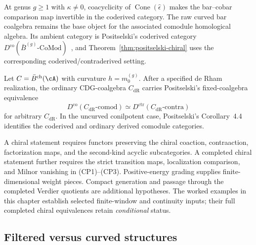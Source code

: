 \begin{remark}
\label{rem:positselski-acyclicity}
At genus $g \geq 1$ with $\kappa \neq 0$, coacyclicity of
$\operatorname{Cone}(\widehat\epsilon)$ makes the bar--cobar
comparison map invertible in the coderived category.  The raw curved
bar coalgebra remains the base object for the associated comodule
homological algebra.  Its ambient category is Positselski's coderived
category
$D^{\mathrm{co}}(\bar{B}^{(g)}\text{-}\mathrm{CoMod})$~\cite[\S\S3--4]{Positselski11},
and Theorem~\ref{thm:positselski-chiral} uses the corresponding
coderived/contraderived setting.
\end{remark}

\begin{remark}
\label{rem:derived-coderived-chiral-CDG}
Let \(C=\bar B^{\mathrm{ch}}(\cA)\) with curvature
\(h=m_0^{(g)}\).  After a specified de Rham realization, the ordinary
CDG-coalgebra \(C_{\mathrm{dR}}\) carries Positselski's
fixed-coalgebra equivalence
\[
 D^{\mathrm{co}}(C_{\mathrm{dR}}\text{-}\mathrm{comod})
 \simeq
 D^{\mathrm{ctr}}(C_{\mathrm{dR}}\text{-}\mathrm{contra})
\]
for arbitrary \(C_{\mathrm{dR}}\).  In the uncurved conilpotent case,
Positselski's Corollary~4.4 identifies the coderived and ordinary
derived comodule categories.

A chiral statement requires functors preserving the chiral
coaction, contraaction, factorization maps, and the second-kind
acyclic subcategories.  A completed chiral statement further requires
the strict transition maps, localization comparison, and Milnor
vanishing in \textup{(CP1)--(CP3)}.  Positive-energy grading supplies
finite-dimensional weight pieces.  Compact generation and passage
through the completed Verdier quotients are additional hypotheses.
The worked examples in this chapter establish selected finite-window
and continuity inputs; their full completed chiral equivalences retain
\emph{conditional} status.
\end{remark}

\subsection{Filtered versus curved structures}
\label{sec:filtered-vs-curved}


